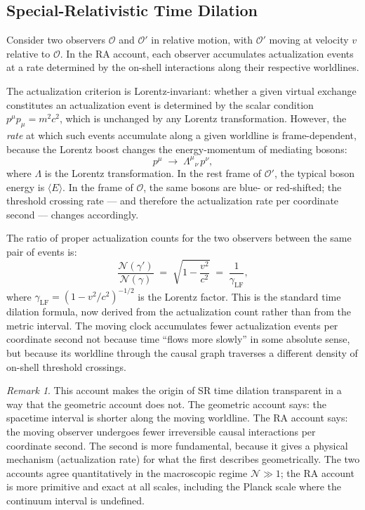 \documentclass[11pt,a4paper]{article}
\theoremstyle{plain}
\theoremstyle{definition}
\theoremstyle{remark}
\newtheorem{remark}[theorem]{Remark}
\begin{document}
\subsection{Special-Relativistic Time Dilation}
\label{subsec:sr_dilation}

Consider two observers $\mathcal{O}$ and $\mathcal{O}'$ in relative motion, with
$\mathcal{O}'$ moving at velocity $v$ relative to $\mathcal{O}$. In the RA
account, each observer accumulates actualization events at a rate determined by
the on-shell interactions along their respective worldlines.

The actualization criterion is Lorentz-invariant: whether a given virtual exchange
constitutes an actualization event is determined by the scalar condition
$p^\mu p_\mu = m^2 c^2$, which is unchanged by any Lorentz transformation.
However, the \emph{rate} at which such events accumulate along a given worldline
is frame-dependent, because the Lorentz boost changes the energy-momentum of
mediating bosons:
\begin{equation}
  p^\mu \;\longrightarrow\; \Lambda^\mu{}_\nu\, p^\nu,
  \label{eq:lorentz_boost}
\end{equation}
where $\Lambda$ is the Lorentz transformation. In the rest frame of $\mathcal{O}'$,
the typical boson energy is $\langle E \rangle$. In the frame of $\mathcal{O}$,
the same bosons are blue- or red-shifted; the threshold crossing rate --- and
therefore the actualization rate per coordinate second --- changes accordingly.

The ratio of proper actualization counts for the two observers between the same
pair of events is:
\begin{equation}
  \frac{\mathcal{N}(\gamma')}{\mathcal{N}(\gamma)}
  \;=\; \sqrt{1 - \frac{v^2}{c^2}}
  \;=\; \frac{1}{\gamma_{\mathrm{LF}}},
  \label{eq:sr_dilation}
\end{equation}
where $\gamma_{\mathrm{LF}} = (1-v^2/c^2)^{-1/2}$ is the Lorentz factor.
This is the standard time dilation formula, now derived from the actualization
count rather than from the metric interval. The moving clock accumulates fewer
actualization events per coordinate second not because time ``flows more slowly''
in some absolute sense, but because its worldline through the causal graph
traverses a different density of on-shell threshold crossings.

\begin{remark}
This account makes the origin of SR time dilation transparent in a way that the
geometric account does not. The geometric account says: the spacetime interval is
shorter along the moving worldline. The RA account says: the moving observer
undergoes fewer irreversible causal interactions per coordinate second. The
second is more fundamental, because it gives a physical mechanism (actualization
rate) for what the first describes geometrically. The two accounts agree quantitatively in the macroscopic regime
$\mathcal{N} \gg 1$; the RA account is more primitive and exact at all scales,
including the Planck scale where the continuum interval is undefined.
\end{remark}
\end{document}
